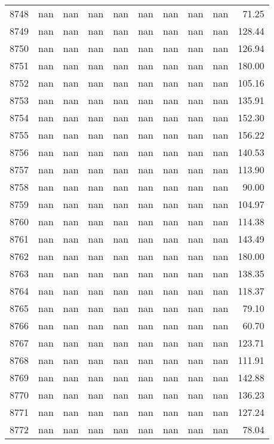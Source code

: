 \begin{tabular}{lrrrrrrrrr}
8748 & nan & nan & nan & nan & nan & nan & nan & nan & 71.25 \\
8749 & nan & nan & nan & nan & nan & nan & nan & nan & 128.44 \\
8750 & nan & nan & nan & nan & nan & nan & nan & nan & 126.94 \\
8751 & nan & nan & nan & nan & nan & nan & nan & nan & 180.00 \\
8752 & nan & nan & nan & nan & nan & nan & nan & nan & 105.16 \\
8753 & nan & nan & nan & nan & nan & nan & nan & nan & 135.91 \\
8754 & nan & nan & nan & nan & nan & nan & nan & nan & 152.30 \\
8755 & nan & nan & nan & nan & nan & nan & nan & nan & 156.22 \\
8756 & nan & nan & nan & nan & nan & nan & nan & nan & 140.53 \\
8757 & nan & nan & nan & nan & nan & nan & nan & nan & 113.90 \\
8758 & nan & nan & nan & nan & nan & nan & nan & nan & 90.00 \\
8759 & nan & nan & nan & nan & nan & nan & nan & nan & 104.97 \\
8760 & nan & nan & nan & nan & nan & nan & nan & nan & 114.38 \\
8761 & nan & nan & nan & nan & nan & nan & nan & nan & 143.49 \\
8762 & nan & nan & nan & nan & nan & nan & nan & nan & 180.00 \\
8763 & nan & nan & nan & nan & nan & nan & nan & nan & 138.35 \\
8764 & nan & nan & nan & nan & nan & nan & nan & nan & 118.37 \\
8765 & nan & nan & nan & nan & nan & nan & nan & nan & 79.10 \\
8766 & nan & nan & nan & nan & nan & nan & nan & nan & 60.70 \\
8767 & nan & nan & nan & nan & nan & nan & nan & nan & 123.71 \\
8768 & nan & nan & nan & nan & nan & nan & nan & nan & 111.91 \\
8769 & nan & nan & nan & nan & nan & nan & nan & nan & 142.88 \\
8770 & nan & nan & nan & nan & nan & nan & nan & nan & 136.23 \\
8771 & nan & nan & nan & nan & nan & nan & nan & nan & 127.24 \\
8772 & nan & nan & nan & nan & nan & nan & nan & nan & 78.04 \\

\end{tabular}
